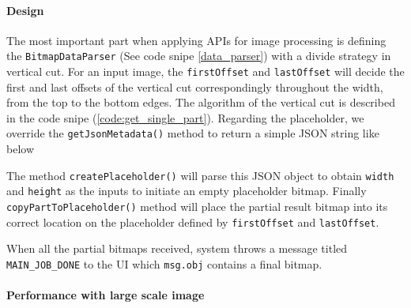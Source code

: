 \documentclass[conference]{IEEEtran}
\begin{document}
\paragraph{Design}
The most important part when applying APIs for image processing is defining the \texttt{BitmapDataParser} (See code snipe \ref{data_parser}) with a divide strategy in vertical cut. For an input image, the \texttt{firstOffset} and \texttt{lastOffset} will decide the first and last offsets of the vertical cut correspondingly throughout the width, from the top to the bottom edges. The algorithm of the vertical cut is described in the code snipe (\ref{code:get_single_part}). Regarding the placeholder, we override the \texttt{getJsonMetadata()} method to return a simple JSON string like below\\

\noindent {}

The method \texttt{createPlaceholder()} will parse this JSON object to obtain \texttt{width} and \texttt{height} as the inputs to initiate an empty placeholder bitmap. Finally \texttt{copyPartToPlaceholder()} method will place the partial result bitmap into its correct location on the placeholder defined by \texttt{firstOffset} and \texttt{lastOffset}.\\

\noindent {}

When all the partial bitmaps received, system throws a message titled \texttt{MAIN\_JOB\_DONE} to the UI which \texttt{msg.obj} contains a final bitmap.

\paragraph{Performance with large scale image}
\end{document}
